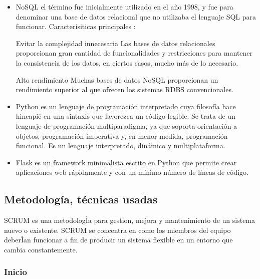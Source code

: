 \documentclass[preprint,12pt]{elsarticle}
\begin{document}
\begin{itemize}


\item NoSQL el término fue inicialmente utilizado en el año 1998, y fue para denominar una base de datos relacional que no utilizaba el lenguaje SQL para funcionar.
Caracterisiticas principales :

Evitar la complejidad innecesaria  Las bases de datos relacionales proporcionan gran cantidad de funcionalidades y restricciones para mantener la consistencia de los datos, en ciertos casos, mucho más de lo necesario.

Alto rendimiento Muchas bases de datos NoSQL proporcionan un rendimiento superior al que ofrecen los sistemas RDBS convencionales.
\cite{UniversidadMadrid}

\item Python es un lenguaje de programación interpretado cuya filosofía hace hincapié en una sintaxis que favorezca un código legible. Se trata de un lenguaje de programación multiparadigma, ya que soporta orientación a objetos, programación imperativa y, en menor medida, programación funcional. Es un lenguaje interpretado, dinámico y multiplataforma.

\item Flask es un framework minimalista escrito en Python que permite crear aplicaciones web rápidamente y con un mínimo número de líneas de código.
\end{itemize}


\subsection{\textbf{Metodología, técnicas usadas}}

SCRUM es una metodologÌa para gestion, mejora y mantenimiento de un sistema nuevo o existente. SCRUM se concentra en como los miembros del equipo deberÌan funcionar a fin de producir un sistema flexible en un entorno que cambia constantemente. \cite{ScrumDef}

\subsubsection{\textbf{Inicio}}
\end{document}
